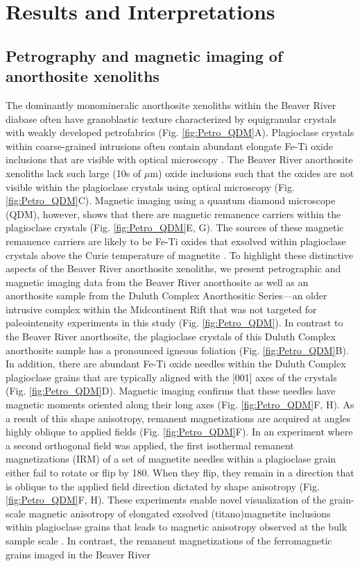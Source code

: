 \section{Results and Interpretations}

\subsection*{Petrography and magnetic imaging of anorthosite xenoliths}

The dominantly monomineralic anorthosite xenoliths within the Beaver River diabase often have granoblastic texture characterized by equigranular crystals with weakly developed petrofabrics (Fig. \ref{fig:Petro_QDM}A). Plagioclase crystals within coarse-grained intrusions often contain abundant elongate Fe-Ti oxide inclusions that are visible with optical microscopy \citep{Feinberg2006a, Wenk2011a, Ageeva2016a}. The Beaver River anorthosite xenoliths lack such large (10s of $\mu$m) oxide inclusions such that the oxides are not visible within the plagioclase crystals using optical microscopy (Fig. \ref{fig:Petro_QDM}C). Magnetic imaging using a quantum diamond microscope (QDM), however, shows that there are magnetic remanence carriers within the plagioclase crystals (Fig. \ref{fig:Petro_QDM}E, G). The sources of these magnetic remanence carriers are likely to be Fe-Ti oxides that exsolved within plagioclase crystals above the Curie temperature of magnetite \citep{Zhang2021b, Bian2021a}. To highlight these distinctive aspects of the Beaver River anorthosite xenoliths, we present petrographic and magnetic imaging data from the Beaver River anorthosite as well as an anorthosite sample from the Duluth Complex Anorthositic Series---an older intrusive complex within the Midcontinent Rift that was not targeted for paleointensity experiments in this study (Fig. \ref{fig:Petro_QDM}). In contrast to the Beaver River anorthosite, the plagioclase crystals of this Duluth Complex anorthosite sample has a pronounced igneous foliation (Fig. \ref{fig:Petro_QDM}B). In addition, there are abundant Fe-Ti oxide needles within the Duluth Complex plagioclase grains that are typically aligned with the [001] axes of the crystals (Fig. \ref{fig:Petro_QDM}D). Magnetic imaging confirms that these needles have magnetic moments oriented along their long axes (Fig. \ref{fig:Petro_QDM}F, H). As a result of this shape anisotropy, remanent magnetizations are acquired at angles highly oblique to applied fields (Fig. \ref{fig:Petro_QDM}F). In an experiment where a second orthogonal field was applied, the first isothermal remanent magnetizations (IRM) of a set of magnetite needles within a plagioclase grain either fail to rotate or flip by 180\textdegree. When they flip, they remain in a direction that is oblique to the applied field direction dictated by shape anisotropy (Fig. \ref{fig:Petro_QDM}F, H). These experiments enable novel visualization of the grain-scale magnetic anisotropy of elongated exsolved (titano)magnetite inclusions within plagioclase grains that leads to magnetic anisotropy observed at the bulk sample scale \citep{Selkin2000a, Feinberg2006a}. In contrast, the remanent magnetizations of the ferromagnetic grains imaged in the Beaver River 